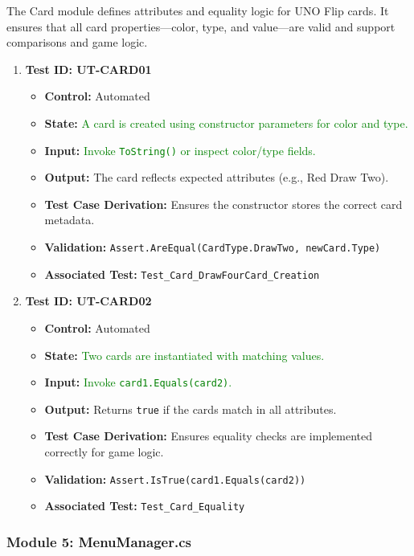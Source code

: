 \documentclass[12pt]{article}
\newcommand{\added}[1]{\textcolor{green}{#1}}
\begin{document}
The Card module defines attributes and equality logic for UNO Flip cards. It ensures that all card properties—color, type, and value—are valid and support comparisons and game logic.

\begin{enumerate}
    \item \textbf{Test ID: UT-CARD01}
    \begin{itemize}
        \item \textbf{Control:} Automated
        \item \textbf{State:} \added{A card is created using constructor parameters for color and type.}
        \item \textbf{Input:} \added{Invoke \texttt{ToString()} or inspect color/type fields.}
        \item \textbf{Output:} The card reflects expected attributes (e.g., Red Draw Two).
        \item \textbf{Test Case Derivation:} Ensures the constructor stores the correct card metadata.
        \item \textbf{Validation:} \texttt{Assert.AreEqual(CardType.DrawTwo, newCard.Type)}
        \item \textbf{Associated Test:} \texttt{Test\_Card\_DrawFourCard\_Creation}
    \end{itemize}

    \item \textbf{Test ID: UT-CARD02}
    \begin{itemize}
        \item \textbf{Control:} Automated
        \item \textbf{State:} \added{Two cards are instantiated with matching values.}
        \item \textbf{Input:} \added{Invoke \texttt{card1.Equals(card2)}.}
        \item \textbf{Output:} Returns \texttt{true} if the cards match in all attributes.
        \item \textbf{Test Case Derivation:} Ensures equality checks are implemented correctly for game logic.
        \item \textbf{Validation:} \texttt{Assert.IsTrue(card1.Equals(card2))}
        \item \textbf{Associated Test:} \texttt{Test\_Card\_Equality}
    \end{itemize}
\end{enumerate}

\subsubsection{Module 5: MenuManager.cs}
\end{document}
